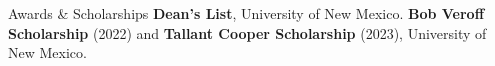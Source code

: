 \begin{rubric}{Awards \& Scholarships}
\entry*[2020 -- 2024] \textbf{Dean's List}, University of New Mexico.
\entry*[2022, 2023] \textbf{Bob Veroff Scholarship} (2022) and \textbf{Tallant Cooper Scholarship} (2023), University of New Mexico.
\end{rubric}
